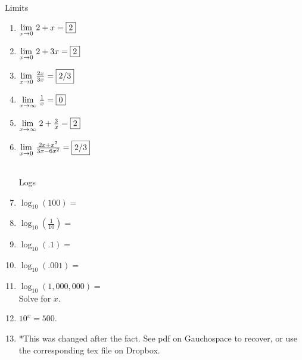 \documentclass{article}
\begin{document}
\newtheorem*{theorem*}{Theorem}
	
	
	\centerline{\Large{ Limits}}\vspace{12 pt}
	\begin{enumerate} 
	\item $\underset{x \rightarrow 0}{\lim} \ 2+x=\fbox{2}$
	\item $\underset{x \rightarrow 0}{\lim} \ 2+3x=\fbox{2}$
	\item $\underset{x \rightarrow 0}{\lim} \ \frac{2x}{3x}=\fbox{2/3}$
\item $\underset{x \rightarrow \infty}{\lim} \ \frac{1}{x}=\fbox{0}$
	\item $\underset{x \rightarrow \infty}{\lim} \ 2 + \frac{3}{x}=\fbox{2}$ 
	\item $\underset{x \rightarrow 0}{\lim} \ \frac{2x + x^2}{3x - 6x^2}=\fbox{2/3}$
	\\ \\
	\centerline{\Large{ Logs \ \ \ \ \ \ \ \ \ \ \ }}\vspace{12 pt}
	\item $\log_{10}(100) = $
	\item $\log_{10}(\frac{1}{10}) = $
	\item $\log_{10}(.1) = $
	\item $\log_{10}(.001) = $
	\item $\log_{10}(1,000,000) = $ \\ 
	Solve for $x$.
	\item $10^{x} = 500$. 
	\item 
	*This was changed after the fact. See pdf on Gauchospace to recover, or use the corresponding tex file on Dropbox. 
	\end{enumerate}
    

	
\end{document}
